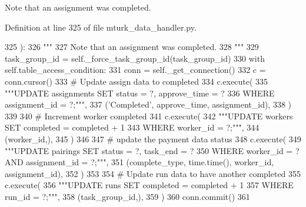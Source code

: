 \begin{DoxyVerb}Note that an assignment was completed.
\end{DoxyVerb}
 

Definition at line 325 of file mturk\+\_\+data\+\_\+handler.\+py.


\begin{DoxyCode}
325     ):
326         \textcolor{stringliteral}{"""}
327 \textcolor{stringliteral}{        Note that an assignment was completed.}
328 \textcolor{stringliteral}{        """}
329         task\_group\_id = self.\_force\_task\_group\_id(task\_group\_id)
330         with self.table\_access\_condition:
331             conn = self.\_get\_connection()
332             c = conn.cursor()
333             \textcolor{comment}{# Update assign data to completed}
334             c.execute(
335                 \textcolor{stringliteral}{"""UPDATE assignments SET status = ?, approve\_time = ?}
336 \textcolor{stringliteral}{                         WHERE assignment\_id = ?;"""},
337                 (\textcolor{stringliteral}{'Completed'}, approve\_time, assignment\_id),
338             )
339 
340             \textcolor{comment}{# Increment worker completed}
341             c.execute(
342                 \textcolor{stringliteral}{"""UPDATE workers SET completed = completed + 1}
343 \textcolor{stringliteral}{                         WHERE worker\_id = ?;"""},
344                 (worker\_id,),
345             )
346 
347             \textcolor{comment}{# update the payment data status}
348             c.execute(
349                 \textcolor{stringliteral}{"""UPDATE pairings SET status = ?, task\_end = ?}
350 \textcolor{stringliteral}{                         WHERE worker\_id = ? AND assignment\_id = ?;"""},
351                 (complete\_type, time.time(), worker\_id, assignment\_id),
352             )
353 
354             \textcolor{comment}{# Update run data to have another completed}
355             c.execute(
356                 \textcolor{stringliteral}{"""UPDATE runs SET completed = completed + 1}
357 \textcolor{stringliteral}{                         WHERE run\_id = ?;"""},
358                 (task\_group\_id,),
359             )
360             conn.commit()
361 
\end{DoxyCode}
\mbox{\label{classparlai_1_1mturk_1_1core_1_1dev_1_1mturk__data__handler_1_1MTurkDataHandler_a42409b508f2b135f6d02c80f39aee466}} 
